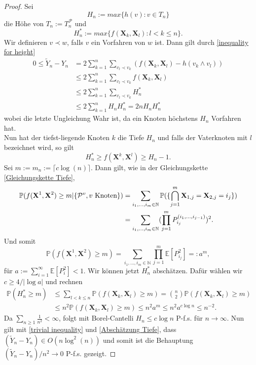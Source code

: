 \begin{proof}
Sei 
\begin{equation}
H_n := max\{h(v) : v \in T_n\}
\end{equation}
die Höhe von $T_n := T_n^\mathcal{P}$ und
\begin{equation}
H^*_n := max\{f(\textbf{X}_k,\textbf{X}_l) : l < k \leq n\}.
\end{equation}
Wir definieren $v \prec w$, falls $v$ ein Vorfahren von $w$ ist. Dann gilt durch \ref{inequality for height}
\begin{align}
    0 \leq \tilde{Y}_n - Y_n &= 2\sum_{k=1}^{n}\sum_{v_l \prec v_k}(f(\textbf{X}_k,\textbf{X}_l)-h(v_k \wedge v_l)) \nonumber\\
    &\leq 2\sum_{k=1}^{n}\sum_{v_l \prec v_k}f(\textbf{X}_k,\textbf{X}_l) \nonumber \\
    &\leq 2\sum_{k=1}^{n}\sum_{v_l \prec v_k}H_n^* \nonumber \\
    &\leq 2\sum_{k=1}^{n}H_nH_n^*  = 2nH_nH_n^* \label{Abschätzung Tiefe}
\end{align}
wobei die letzte Ungleichung Wahr ist, da ein Knoten höchstens $H_n$ Vorfahren hat. \\
Nun hat der tiefst-liegende Knoten $k$ die Tiefe $H_n$ und falls der Vaterknoten mit $l$ bezeichnet wird, so gilt 
\begin{equation}
    H^*_n \geq f(\textbf{X}^k,\textbf{X}^l) \geq H_n - 1. \label{trivial inequality}
\end{equation}
Sei $m := m_n := \lceil c \log(n) \rceil$. Dann gilt, wie in der Gleichungskette \ref{Gleichungskette Tiefe},
\begin{align*}
\mathbb{P}(f(\textbf{X}^1,\textbf{X}^2)\geq m| \{\mathcal{P}^v, v \textnormal{ Knoten}\}) &=\sum_{i_1,...,i_m \in \mathbb{N}} \mathbb{P}( \{\bigcap_{j=1}^{m}\textbf{X}_{1,j}=\textbf{X}_{2,j} = i_j \}) \\ 
&=\sum_{i_1,...,i_m \in \mathbb{N}}(\prod_{j=1}^{m}P_{i_j}^{(i_1,...,i_{j-1})}) ^2.
\end{align*}
Und somit
\[
\mathbb{P}(f(\textbf{X}^1,\textbf{X}^2)\geq m) = \sum_{i_1,...,i_m \in \mathbb{N}}\prod_{j=1}^{m}\mathbb{E}[P_{i_j}^2]  =: a^m,
\]
für $a := \sum_{i=1}^{\infty}\mathbb{E}[P_i^2] < 1$. Wir können jetzt $H^*_n$ abschätzen. Dafür wählen wir $c \geq 4 / |\log{a}|$ und rechnen
\begin{align*}
\mathbb{P}(H^*_n \geq m) &\leq \sum_{l < k \leq n} \mathbb{P}(f(\textbf{X}_k,\textbf{X}_l) \geq m) = {n\choose 2}\mathbb{P}(f(\textbf{X}_k,\textbf{X}_l) \geq m)\\
&\leq n^2\mathbb{P}(f(\textbf{X}_k,\textbf{X}_l) \geq m) \leq n^2a^m \leq n^2a^{c \log{n}} \leq n^{-2}.
\end{align*}
Da $\sum_{n \geq 1}\frac{1}{n^2} < \infty$, folgt mit Borel-Cantelli $H_n \leq c \log{n}$ P-f.s. für $n \to \infty$. Nun gilt mit \ref{trivial inequality} und \ref{Abschätzung Tiefe}, dass $(\tilde{Y}_n - Y_n) \in O(n\log^2(n))$ und somit ist die Behauptung $(\tilde{Y}_n-Y_n)/n^2 \rightarrow 0 $ P-f.s. gezeigt. 
\end{proof}
